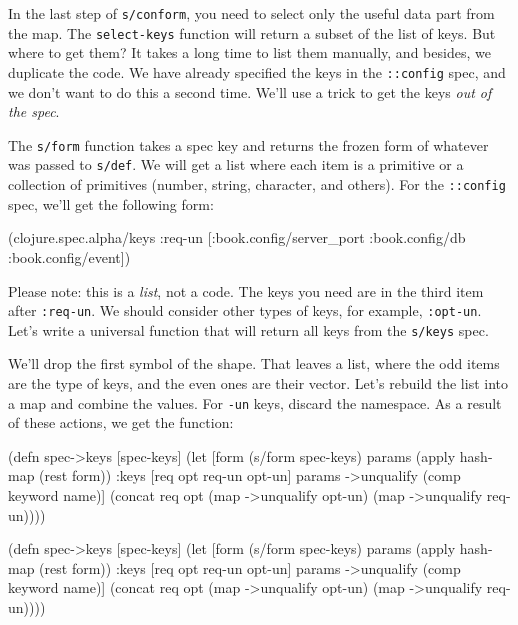 
In the last step of \verb|s/conform|, you need to select only the useful data part from the map. The \verb|select-keys| function will return a subset of the list of keys. But where to get them? It takes a long time to list them manually, and besides, we duplicate the code. We have already specified the keys in the \verb|::config| spec, and we don't want to do this a second time. We'll use a trick to get the keys \emph{out of the spec}.

The \verb|s/form| function takes a spec key and returns the frozen form of whatever was passed to \verb|s/def|. We will get a list where each item is a primitive or a collection of primitives (number, string, character, and others).
For the \verb|::config| spec, we'll get the following form:

\begin{clojure}
(clojure.spec.alpha/keys
 :req-un [:book.config/server_port
          :book.config/db
          :book.config/event])
\end{clojure}


Please note: this is a \emph{list}, not a code. The keys you need are in the third item after \verb|:req-un|. We should consider other types of keys, for example, \verb|:opt-un|. Let's write a universal function that will return all keys from the \verb|s/keys| spec.

We'll drop the first symbol of the shape.  That leaves a list, where the odd items are the type of keys, and the even ones are their vector. Let's rebuild the list into a map and combine the values. For \verb|-un| keys, discard the namespace. As a result of these actions, we get the function:


\ifnarrow

\begin{clojure}
(defn spec->keys
  [spec-keys]
  (let [form (s/form spec-keys)
        params (apply hash-map
                 (rest form))
        {:keys [req opt req-un opt-un]}
        params
        ->unqualify (comp keyword name)]
    (concat req
            opt
            (map ->unqualify opt-un)
            (map ->unqualify req-un))))
\end{clojure}

\else

\begin{clojure}
(defn spec->keys
  [spec-keys]
  (let [form (s/form spec-keys)
        params (apply hash-map (rest form))
        {:keys [req opt req-un opt-un]} params
        ->unqualify (comp keyword name)]
    (concat req
            opt
            (map ->unqualify opt-un)
            (map ->unqualify req-un))))
\end{clojure}

